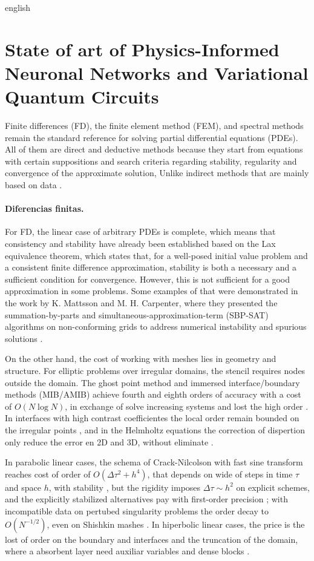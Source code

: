 \documentclass[0000.tex]{subfiles}
\begin{document}
\begin{hyphenrules}{english}
\section{State of art of Physics-Informed Neuronal Networks and Variational Quantum Circuits}

Finite differences (FD), the finite element method (FEM), and spectral methods remain the standard reference for solving partial differential equations (PDEs). All of them 
are direct and deductive methods because they start from equations with certain suppositions and search criteria regarding stability, regularity and convergence of the 
approximate solution, Unlike indirect methods that are mainly based on data \cite{nooraiepour2026partial,thomee2001finite}.

\paragraph{Diferencias finitas.}
For FD, the linear case of arbitrary PDEs is complete, which means that consistency and stability have already been established based on the Lax equivalence 
theorem, which states that, for a well-posed initial value problem and a consistent finite difference approximation, stability is both a necessary and a sufficient 
condition for convergence. However, this is not sufficient for a good approximation in some problems. Some examples of that were demonstrated in the work by K. Mattsson 
and M. H. Carpenter, where they presented the summation-by-parts and simultaneous-approximation-term (SBP-SAT) algorithms on non-conforming grids to address 
numerical instability and spurious solutions \cite{leveque2007finite,svard2014review}. 

On the other hand, the cost of working with meshes lies in geometry and structure. For elliptic problems over irregular domains, the stencil requires nodes outside the domain. The ghost point method and immersed interface/boundary 
methods (MIB/AMIB) achieve fourth and eighth orders of accuracy with a cost of $O(N\log N)$, in exchange of solve increasing systems and lost the high order 
\cite{ren2022fft,coco2024high}. In interfaces with high contrast coefficientes the local order remain bounded on the irregular points \cite{feng2022high}, and 
in the Helmholtz equations the correction of dispertion only reduce the error en 2D and 3D, without eliminate \cite{cocquet2024asymptotic}. 

In parabolic linear cases, the schema of Crack-Nilcolson with fast sine transform reaches cost of order of $O(\Delta \tau^2+h^4)$, that depends on wide of steps in time 
$\tau$ and space $h$, with stability \cite{li2023fast}, but the rigidity imposes $\Delta \tau \sim h^2$ on explicit schemes, and the explicitly stabilized alternatives 
pay with first-order precision \cite{abdulle2022explicit}; with incompatible data on pertubed singularity problems the order decay to $O(N^{-1/2})$, even on Shishkin 
mashes \cite{gracia2023singularly}. In hiperbolic linear cases, the price is the lost of order on the boundary and interfaces \cite{wang2022energy} and the truncation 
of the domain, where a absorbent layer need auxiliar variables and dense blocks \cite{hojas2024reflectionless}. 


\end{hyphenrules}
\end{document}
